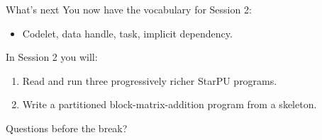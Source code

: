 \documentclass[presentation, aspectratio=169]{beamer}
\begin{document}
\begin{frame}[label={sec:orgbd8b565}]{What's next}
You now have the vocabulary for Session 2:
\begin{itemize}
\item \alert{Codelet}, \alert{data handle}, \alert{task}, implicit \alert{dependency}.
\end{itemize}

In Session 2 you will:
\begin{enumerate}
\item Read and run three progressively richer StarPU programs.
\item Write a partitioned block-matrix-addition program from a skeleton.
\end{enumerate}

Questions before the break?
\end{frame}
\end{document}

